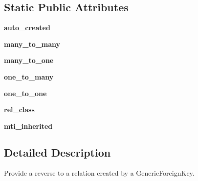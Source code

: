 \subsection*{Static Public Attributes}
\begin{DoxyCompactItemize}
\item 
\mbox{\label{classdjango_1_1contrib_1_1contenttypes_1_1fields_1_1_generic_relation_a16f5ca0cde9a4934823af08910d8362a}} 
{\bfseries auto\+\_\+created}
\item 
\mbox{\label{classdjango_1_1contrib_1_1contenttypes_1_1fields_1_1_generic_relation_aa39dff81df4c14d10f1c4936c6e037c3}} 
{\bfseries many\+\_\+to\+\_\+many}
\item 
\mbox{\label{classdjango_1_1contrib_1_1contenttypes_1_1fields_1_1_generic_relation_a4e0a62f615d2e92b9af9c3fdd4ee177a}} 
{\bfseries many\+\_\+to\+\_\+one}
\item 
\mbox{\label{classdjango_1_1contrib_1_1contenttypes_1_1fields_1_1_generic_relation_acb9580a5af15fdef5693f0998fbf8cd8}} 
{\bfseries one\+\_\+to\+\_\+many}
\item 
\mbox{\label{classdjango_1_1contrib_1_1contenttypes_1_1fields_1_1_generic_relation_a1374a276eb4466bd12f4880dc203f3f7}} 
{\bfseries one\+\_\+to\+\_\+one}
\item 
\mbox{\label{classdjango_1_1contrib_1_1contenttypes_1_1fields_1_1_generic_relation_a4eca079bc3baa929fb995c91d29f3e0b}} 
{\bfseries rel\+\_\+class}
\item 
\mbox{\label{classdjango_1_1contrib_1_1contenttypes_1_1fields_1_1_generic_relation_aa911b71c88a00fd4949879109d764017}} 
{\bfseries mti\+\_\+inherited}
\end{DoxyCompactItemize}


\subsection{Detailed Description}
\begin{DoxyVerb}Provide a reverse to a relation created by a GenericForeignKey.
\end{DoxyVerb}
 

